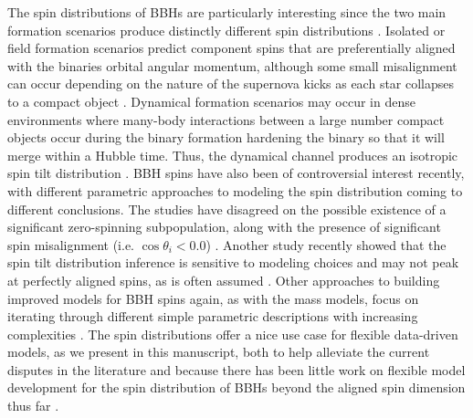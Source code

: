 The spin distributions of BBHs are particularly interesting since the two main formation scenarios produce distinctly different spin distributions . 
Isolated or field formation scenarios predict component spins that are preferentially aligned with the binaries orbital angular momentum, although some small 
misalignment can occur depending on the nature of the supernova kicks as each star collapses to a compact object . Dynamical formation scenarios may 
occur in dense environments where many-body interactions between a large number compact objects occur during the binary formation hardening the binary so that it 
will merge within a Hubble time. Thus, the dynamical channel produces an isotropic spin tilt distribution . BBH spins have also been of controversial 
interest recently, with different parametric approaches to modeling the spin distribution coming to different conclusions. The studies have disagreed on the possible existence 
of a significant zero-spinning subpopulation, along with the presence of significant spin misalignment (i.e. $\cos{\theta_i} < 0.0$) \citep{o3b_astro_dist,RouletGWTC2Pop,BuildBetterSpinModels,GWTC3MonashSpin,Callister_NoEvidence}. 
Another study recently showed that the spin tilt distribution inference is sensitive to modeling choices and may not peak at perfectly aligned spins, as is often assumed \citep{spinitasyoulike}. 
Other approaches to building improved models for BBH spins again, as with the mass models, focus on iterating through different simple parametric descriptions with 
increasing complexities \citep{BuildBetterSpinModels,Callister_NoEvidence,spinitasyoulike}. The spin distributions offer a nice use case for flexible data-driven models, as 
we present in this manuscript, both to help alleviate the current disputes in the literature and because there has been little work on flexible model development for the 
spin distribution of BBHs beyond the aligned spin dimension thus far \citep{Tiwari_2021_a,Tiwari_2021_b}.

